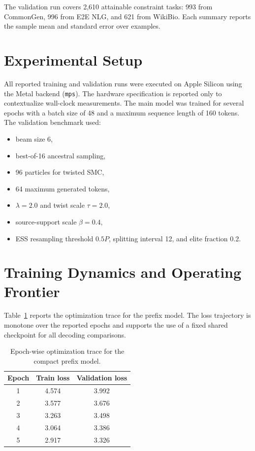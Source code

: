 \documentclass[11pt]{article}
\begin{document}
The validation run covers 2{,}610 attainable constraint tasks: 993 from CommonGen, 996 from E2E NLG, and 621 from WikiBio. Each summary reports the sample mean and standard error over examples.

\section{Experimental Setup}
All reported training and validation runs were executed on Apple Silicon using the Metal backend (\texttt{mps}). The hardware specification is reported only to contextualize wall-clock measurements. The main model was trained for several epochs with a batch size of 48 and a maximum sequence length of 160 tokens. The validation benchmark used:
\begin{itemize}[leftmargin=1.5em]
  \item beam size 6,
  \item best-of-16 ancestral sampling,
  \item 96 particles for twisted SMC,
  \item 64 maximum generated tokens,
  \item $\lambda=2.0$ and twist scale $\tau=2.0$,
  \item source-support scale $\beta=0.4$,
  \item ESS resampling threshold $0.5P$, splitting interval 12, and elite fraction 0.2.
\end{itemize}

\section{Training Dynamics and Operating Frontier}
Table~\ref{tab:training-loss} reports the optimization trace for the prefix model. The loss trajectory is monotone over the reported epochs and supports the use of a fixed shared checkpoint for all decoding comparisons.

\begin{table}[H]
\centering
\caption{Epoch-wise optimization trace for the compact prefix model.}
\label{tab:training-loss}
\begin{tabular}{ccc}
\toprule
Epoch & Train loss & Validation loss \\
\midrule
1 & 4.574 & 3.992 \\
2 & 3.577 & 3.676 \\
3 & 3.263 & 3.498 \\
4 & 3.064 & 3.386 \\
5 & 2.917 & 3.326 \\
\bottomrule
\end{tabular}
\end{table}
\end{document}
